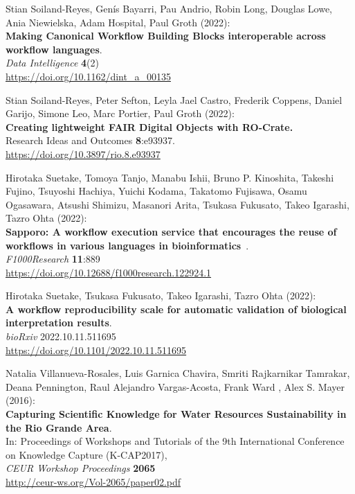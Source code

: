 \documentclass[10pt,letterpaper]{article}
\begin{document}
\begin{thebibliography}{10}
 Stian Soiland-Reyes, Genís Bayarri, Pau
Andrio, Robin Long, Douglas Lowe, Ania Niewielska, Adam Hospital, Paul
Groth (2022):\\
\textbf{Making Canonical Workflow Building Blocks interoperable across
workflow languages}.\\
\emph{Data Intelligence} \textbf{4}(2)\\
\url{https://doi.org/10.1162/dint_a_00135}

 Stian Soiland-Reyes, Peter Sefton, Leyla Jael
Castro, Frederik Coppens, Daniel Garijo, Simone Leo, Marc Portier, Paul
Groth (2022):\\
\textbf{Creating lightweight FAIR Digital Objects with RO-Crate.}\\
Research Ideas and Outcomes \textbf{8}:e93937.\\
\url{https://doi.org/10.3897/rio.8.e93937}

 Hirotaka Suetake, Tomoya Tanjo, Manabu Ishii, Bruno
P. Kinoshita, Takeshi Fujino, Tsuyoshi Hachiya, Yuichi Kodama, Takatomo
Fujisawa, Osamu Ogasawara, Atsushi Shimizu, Masanori Arita, Tsukasa
Fukusato, Takeo Igarashi, Tazro Ohta (2022):\\
\textbf{Sapporo: A workflow execution service that encourages the reuse
of workflows in various languages in bioinformatics}~\cite{version 1; peer
review: awaiting peer review}.\\
\emph{F1000Research} \textbf{11}:889\\
\url{https://doi.org/10.12688/f1000research.122924.1}

 Hirotaka Suetake, Tsukasa Fukusato, Takeo Igarashi,
Tazro Ohta (2022):\\
\textbf{A workflow reproducibility scale for automatic validation of
biological interpretation results}.\\
\emph{bioRxiv} 2022.10.11.511695\\
\url{https://doi.org/10.1101/2022.10.11.511695}

 Natalia Villanueva-Rosales, Luis Garnica
Chavira, Smriti Rajkarnikar Tamrakar, Deana Pennington, Raul Alejandro
Vargas-Acosta, Frank Ward , Alex S. Mayer (2016):\\
\textbf{Capturing Scientific Knowledge for Water Resources
Sustainability in the Rio Grande Area}.\\
In: Proceedings of Workshops and Tutorials of the 9th International
Conference on Knowledge Capture (K-CAP2017),\\
\emph{CEUR Workshop Proceedings} \textbf{2065\\
}\url{http://ceur-ws.org/Vol-2065/paper02.pdf}


\end{thebibliography}
\end{document}
